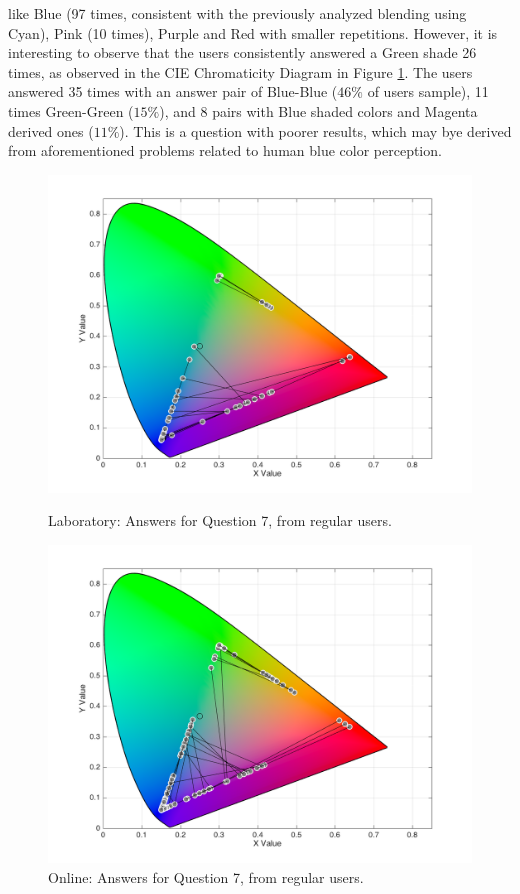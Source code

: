 like Blue (97 times, consistent with the previously analyzed blending using Cyan), Pink (10 times), Purple and Red with smaller repetitions.
However, it is interesting to observe that the users consistently answered a Green shade 26 times, as observed in the CIE Chromaticity Diagram
in Figure \ref{fig:blueblend_2}. The users answered 35 times with an answer pair of Blue-Blue ($46\%$ of users sample), 11 times Green-Green ($15\%$),
and 8 pairs with Blue shaded colors and Magenta derived ones ($11\%$). This is a question with poorer results, which may bye derived from aforementioned
problems related to human blue color perception.
%
\begin{figure}[!htbp]
  \centering
  \begin{minipage}{0.48\textwidth}
    \centering
    \includegraphics[width=\textwidth]{images/results/7_lab_regularUsers.png}
    \caption[Laboratory: Answers for Question 7, from regular users.]{Laboratory: Answers for Question 7, from regular users.}
    \label{fig:blueblend_1}
  \end{minipage}\hfill
  \begin{minipage}{0.48\textwidth}
    \centering
    \includegraphics[width=\textwidth]{images/results/7_online_regularUsers.png}
    \caption[Online: Answers for Question 7, from regular users.]{Online: Answers for Question 7, from regular users.}
    \label{fig:blueblend_2}
  \end{minipage}
\end{figure}
%

